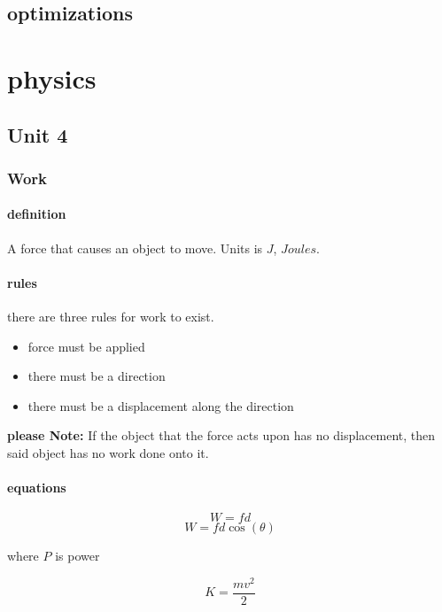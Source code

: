 \documentclass{article} %
\begin{document}
    \subsection{optimizations}
\section{physics}
    \subsection{Unit 4}
        \subsubsection{Work}
            \paragraph{definition}
                A force that causes an object to move. Units is $J$, $Joules$.
            \paragraph{rules}
                there are three rules for work to exist.
                \begin{itemize}
                    \item force must be applied
                    \item there must be a direction
                    \item there must be a displacement along the direction
                \end{itemize}
                \textbf{please Note:} 
                If the object that the force acts upon has no displacement, then said object has no work done onto it.
            \paragraph{equations}
                \begin{equation} W=fd \end{equation}
                \begin{equation} W=fd\cos(\theta) \end{equation}
                \begin{center} where $P$ is power \end{center}
                \begin{equation}
                    K=\frac{mv^2}{2}
                \end{equation}
\end{document}
